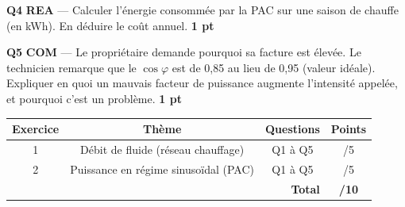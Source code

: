 \documentclass[a4paper,11pt]{article}
\newcommand{\pts}[1]{\hfill\textcolor{gris}{\small\textbf{#1}}}
\newcommand{\comp}[1]{\colorbox{blue!10}{\scriptsize\textbf{#1}}}
\begin{document}
\textbf{Q4} \comp{REA} — Calculer l'énergie consommée par la PAC sur une saison de chauffe (en kWh). En déduire le coût annuel. \pts{1 pt}

\begin{reponsebox}[3.5cm]
\dotfill

\dotfill

\dotfill

\dotfill
\end{reponsebox}

\textbf{Q5} \comp{COM} — Le propriétaire demande pourquoi sa facture est élevée. Le technicien remarque que le $\cos\varphi$ est de 0,85 au lieu de 0,95 (valeur idéale). Expliquer en quoi un mauvais facteur de puissance augmente l'intensité appelée, et pourquoi c'est un problème. \pts{1 pt}

\begin{reponsebox}[4cm]
\dotfill

\dotfill

\dotfill

\dotfill

\dotfill
\end{reponsebox}

\vfill

\begin{center}
\begin{tabular}{|c|c|c|c|}
\hline
\textbf{Exercice} & \textbf{Thème} & \textbf{Questions} & \textbf{Points} \\
\hline
1 & Débit de fluide (réseau chauffage) & Q1 à Q5 & /5 \\
\hline
2 & Puissance en régime sinusoïdal (PAC) & Q1 à Q5 & /5 \\
\hline
\multicolumn{3}{|r|}{\textbf{Total}} & \textbf{/10} \\
\hline
\end{tabular}
\end{center}
\end{document}
